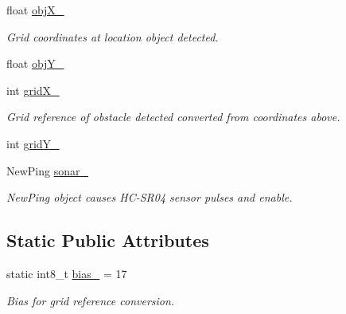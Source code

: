 \begin{DoxyCompactItemize}
\item 
float \mbox{\hyperlink{class_obstacle_sensor_a7ef55ced2aa190347a8a4fda017eec5c}{obj\+X\+\_\+}}
\begin{DoxyCompactList}\small\item\em Grid coordinates at location object detected. \end{DoxyCompactList}\item 
float \mbox{\hyperlink{class_obstacle_sensor_a8df25c3d11ae7b8e652bc8bb56fd6f64}{obj\+Y\+\_\+}}
\item 
int \mbox{\hyperlink{class_obstacle_sensor_a860064c48fae2c973d7e9b59868faff6}{grid\+X\+\_\+}}
\begin{DoxyCompactList}\small\item\em Grid reference of obstacle detected converted from coordinates above. \end{DoxyCompactList}\item 
int \mbox{\hyperlink{class_obstacle_sensor_a31c6b57b181045cf59227db2720da6f4}{grid\+Y\+\_\+}}
\item 
New\+Ping \mbox{\hyperlink{class_obstacle_sensor_a761a011e9009edaaee103d9bafceba14}{sonar\+\_\+}}
\begin{DoxyCompactList}\small\item\em New\+Ping object causes H\+C-\/\+S\+R04 sensor pulses and enable. \end{DoxyCompactList}\end{DoxyCompactItemize}
\subsection*{Static Public Attributes}
\begin{DoxyCompactItemize}
\item 
static int8\+\_\+t \mbox{\hyperlink{class_obstacle_sensor_a7d083be5c0be76782c37d8d41fc636e5}{bias\+\_\+}} = 17
\begin{DoxyCompactList}\small\item\em Bias for grid reference conversion. \end{DoxyCompactList}\end{DoxyCompactItemize}
